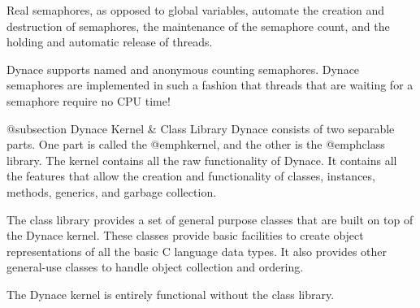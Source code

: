 Real semaphores, as opposed to global variables, automate the creation and
destruction of semaphores, the maintenance of the semaphore count, and
the holding and automatic release of threads.

Dynace supports named and anonymous counting semaphores.  Dynace semaphores
are implemented in such a fashion that threads that are waiting for
a semaphore require no CPU time!

@subsection Dynace Kernel & Class Library
Dynace consists of two separable parts.  One part is called the @emph{kernel},
and the other is the @emph{class library}.  The kernel contains all the
raw functionality of Dynace.  It contains all the features that allow the
creation and functionality of classes, instances, methods, generics, and
garbage collection.  

The class library provides a set of general purpose classes that are
built on top of the Dynace kernel.  These classes provide basic facilities
to create object representations of all the basic C language data types.
It also provides other general-use classes to handle object collection
and ordering.

The Dynace kernel is entirely functional without the class library.

